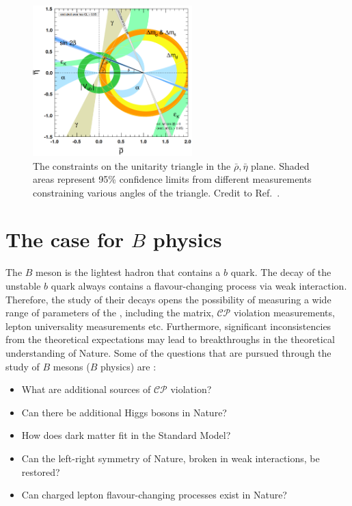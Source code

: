 \begin{figure}
    \centering
    \includegraphics[width=0.55\textwidth]{figures/sm_theory/unitarity_triangle.png}
    \caption{\label{fig:unitarity_triangle}The constraints on the unitarity triangle in the $\bar{\rho},\bar{\eta}$ plane.
    Shaded areas represent  95\% confidence limits from different measurements constraining various angles of the triangle.
    Credit to Ref.~\cite{Workman:2022ynf}.
    }
\end{figure}

\section{The case for \texorpdfstring{$B$}{B} physics}\label{sec:bphysics_case}

The $B$ meson is the lightest hadron that contains a $b$ quark.
The decay of the unstable $b$ quark always contains a flavour-changing process via weak interaction.
Therefore, the study of their decays opens the possibility of measuring a wide range of parameters of the \SM, including the \CKM matrix, $\mathcal{CP}$ violation measurements, lepton universality measurements etc.
Furthermore, significant inconsistencies from the theoretical expectations may lead to breakthroughs in the theoretical understanding of Nature.
Some of the questions that are pursued through the study of $B$ mesons ($B$ physics) are \cite{Belle-II:2018jsg}:
\begin{itemize}
    \item What are additional sources of $\mathcal{CP}$ violation?
    \item Can there be additional Higgs bosons in Nature?
    \item How does dark matter fit in the Standard Model?
    \item Can the left-right symmetry of Nature, broken in weak interactions, be restored?
    \item Can charged lepton flavour-changing processes exist in Nature?
\end{itemize}

